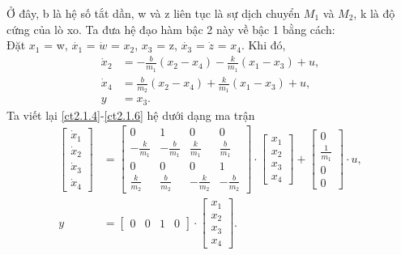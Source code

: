 \begin{example}
Ở đây, b là hệ số tắt dần, w và z liên tục là sự dịch chuyển  $M_1$ và $M_2$, k là độ cứng của lò xo. Ta đưa hệ đạo hàm bậc 2 này về bậc 1 bằng cách:\\
Đặt $x_1$ = w, $\dot{x_1}$ = $\dot{w}$ = $x_2$, $x_3$ = z, $\dot{x_3}$ = $\dot{z}$ = $x_4$. Khi đó,
\begin{align}
\dot{x}_2 &= -\frac{b}{m_1}(x_2 - x_4) - \frac{k}{m_1}(x_1 - x_3) + u \label{ct2.1.4},  \\
\dot{x}_4 &= \frac{b}{m_2}(x_2 - x_4) + \frac{k}{m_1}(x_1 - x_3) + u, \\
y &= x_3.\label{ct2.1.6}
\end{align}
Ta viết lại \eqref{ct2.1.4}-\eqref{ct2.1.6} hệ dưới dạng ma trận
\begin{align}
    \begin{bmatrix}
        \dot{x}_1\\ \dot{x}_2\\ \dot{x}_3\\ \dot{x}_4
    \end{bmatrix}
     &= 
    \begin{bmatrix}
     0 & 1 & 0 & 0\\
     -\frac{k}{m_1} & -\frac{b}{m_1} & \frac{k}{m_1} & \frac{b}{m_1}\\
     0 & 0 & 0 & 1\\
     \frac{k}{m_2} & \frac{b}{m_2} & -\frac{k}{m_2} & -\frac{b}{m_2}
     \end{bmatrix}
     \cdot
     \begin{bmatrix}
     x_1 \\ x_2 \\ x_3 \\ x_4
     \end{bmatrix}
     + 
     \begin{bmatrix}
     0 \\ \frac{1}{m_1} \\ 0 \\ 0
     \end{bmatrix}
     \cdot u,\\
     y &= 
     \begin{bmatrix}
     0 & 0 & 1 & 0 
     \end{bmatrix}
     \cdot
     \begin{bmatrix}
     x_1 \\ x_2 \\ x_3 \\ x_4
     \end{bmatrix}.
\end{align}

\end{example}

